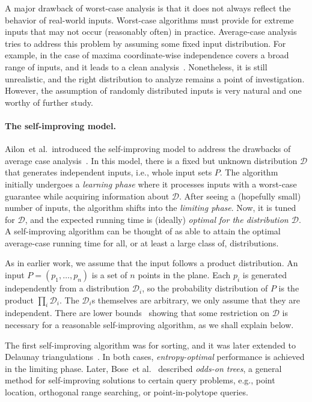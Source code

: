 \documentclass[letterpaper,11pt]{article}
\newcommand{\etal}{et al.}
\newcommand{\cD}{\mathcal{D}}
\begin{document}
A major drawback of worst-case analysis
is that it does not always reflect the behavior
of real-world inputs. Worst-case algorithms 
must provide for extreme inputs that 
may not occur (reasonably often) in 
practice. Average-case analysis tries 
to address this problem by assuming some 
fixed input distribution. For example, in the 
case of maxima 
coordinate-wise independence covers a broad
range of inputs, and it leads to a clean 
analysis~\cite{Buchta89}. Nonetheless, it is still
unrealistic, and the right 
distribution to analyze remains a point of 
investigation. However, the assumption of 
randomly distributed inputs is very natural 
and one worthy of further study.

\paragraph{The self-improving model.} 
Ailon~\etal~introduced the self-improving 
model to address the drawbacks of average 
case analysis~\cite{ACCL}. 
In this model, there is a fixed but 
unknown distribution $\cD$ that 
generates independent inputs, i.e., whole 
input sets $P$. The algorithm initially
undergoes a \emph{learning phase} where 
it processes inputs with a worst-case
guarantee while acquiring information 
about $\cD$. 
After seeing a (hopefully small) 
number of inputs, the algorithm shifts
into the \emph{limiting phase}. Now, it 
is tuned for $\cD$, and the expected 
running time is (ideally) \emph{optimal 
for the distribution $\cD$}. 
A self-improving algorithm 
can be thought of as able to attain 
the optimal average-case
running time for all, or at least 
a large class of, distributions. 

As in earlier work, 
we assume that the input follows a product 
distribution. An input $P = (p_1, \ldots, p_n)$
is a set of $n$ points in the plane. Each 
$p_i$ is generated independently from a 
distribution $\cD_i$, so the probability 
distribution of $P$ is the product 
$\prod_i \cD_i$. The $\cD_i$s themselves
are arbitrary, we only assume that they 
are independent. There are lower 
bounds~\cite{AilonCCLMS11} showing that 
some restriction on $\cD$ is
necessary for a reasonable self-improving 
algorithm, as we shall explain below.

The first self-improving algorithm was 
for sorting, and it was later extended 
to Delaunay 
triangulations~\cite{CS_self_improve,AilonCCLMS11}.
In both cases, \emph{entropy-optimal} 
performance is achieved in the limiting phase.
Later, Bose~\etal~\cite{BoseDeDoDuKiMo10} 
described \emph{odds-on trees}, a general 
method for self-improving solutions to
certain query problems, e.g., 
point location, orthogonal range searching, 
or point-in-polytope queries.
\end{document}
